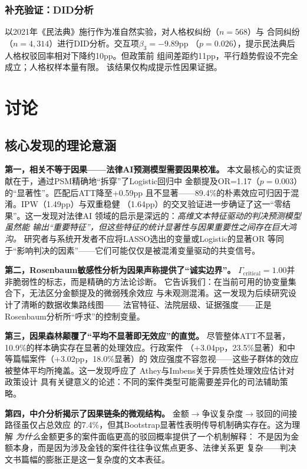 \documentclass[12pt,a4paper,twoside]{ctexart}
\begin{document}
\subsubsection{补充验证：DID分析}

以2021年《民法典》施行作为准自然实验，对人格权纠纷（$n=568$）与
合同纠纷（$n=4,314$）进行DID分析。交互项$\beta_3=-9.89$pp
（$p=0.026$），提示民法典后人格权驳回率相对下降约10pp。但政策前
组间差距约11pp，平行趋势假设不完全成立；人格权样本量有限。
该结果仅构成提示性因果证据。

\section{讨论}

\subsection{核心发现的理论意涵}

\textbf{第一，相关不等于因果——法律AI预测模型需要因果校准。}
本文最核心的实证贡献在于，通过PSM精确地``拆穿''了Logistic回归中
金额提及OR=1.17（$p=0.003$）的``显著性''。匹配后ATT降至+0.59pp
且不显著——89.4\%的朴素效应可归因于混淆。IPW（1.49pp）与双重稳健
（1.64pp）的交叉验证进一步确证了这一``零结果''。这一发现对法律AI
领域的启示是深远的：\textit{高维文本特征驱动的判决预测模型虽然能
输出``重要特征''，但这些特征的统计显著性与因果重要性之间存在巨大鸿沟。}
研究者与系统开发者不应将LASSO选出的变量或Logistic的显著OR
等同于``影响判决的因素''——它们可能仅仅是被混淆变量驱动的共变信号。

\textbf{第二，Rosenbaum敏感性分析为因果声称提供了``诚实边界''。}
$\Gamma_{\text{critical}}=1.00$并非脆弱性的标志，而是精确的方法论诊断。
它告诉我们：在当前可用的协变量集合下，无法区分金额提及的微弱残余效应
与未观测混淆。这一发现为后续研究设计了清晰的数据收集路线图——
法官特征、法院层级、证据强度——正是Rosenbaum分析所``呼求''的控制变量。

\textbf{第三，因果森林颠覆了``平均不显著即无效应''的直觉。}
尽管整体ATT不显著，10.9\%的样本确实存在显著的处理效应。行政案件
（+3.04pp，23.5\%显著）和中等篇幅案件（+3.02pp，18.0\%显著）的
效应强度不容忽视——这些子群体的效应被整体平均所掩盖。这一发现呼应了
Athey与Imbens\cite{athey2019}关于异质性处理效应估计对政策设计
具有关键意义的论述：不同的案件类型可能需要差异化的司法辅助策略。

\textbf{第四，中介分析揭示了因果链条的微观结构。}
金额$\rightarrow$争议复杂度$\rightarrow$驳回的间接路径虽仅占总效应
的7.4\%，但其Bootstrap显著性表明传导机制确实存在。这为理解
\textit{为什么}金额更多的案件面临更高的驳回概率提供了一个机制解释：
不是因为金额本身，而是因为涉及金钱的案件往往争议焦点更多、法律关系更
复杂——判决文书篇幅的膨胀正是这一复杂度的文本表征。
\end{document}

